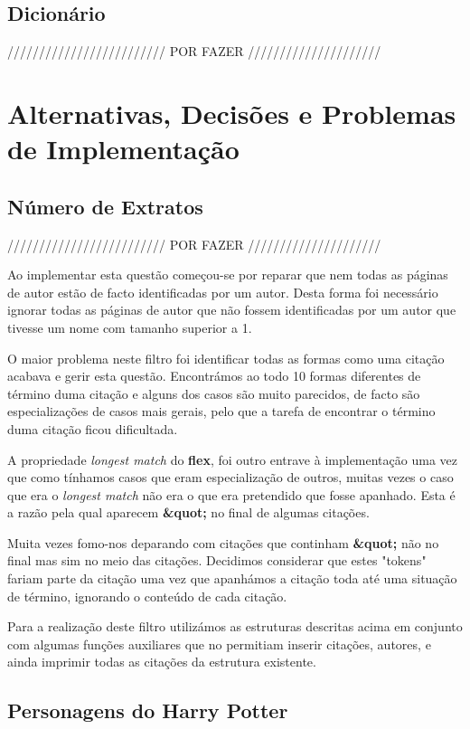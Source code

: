 \documentclass[11pt,a4paper]{report}
\begin{document}
\subsection{Dicionário}
///////////////////////// POR FAZER /////////////////////

\section{Alternativas, Decisões e Problemas de Implementação}

\subsection{Número de Extratos}

///////////////////////// POR FAZER /////////////////////

Ao implementar esta questão começou-se por reparar que nem todas as páginas de autor estão de facto identificadas por um autor. Desta forma foi necessário ignorar todas as páginas de autor que não fossem identificadas por um autor que tivesse um nome com tamanho superior a 1.

O maior problema neste filtro foi identificar todas as formas como uma citação acabava e gerir esta questão. Encontrámos ao todo 10 formas diferentes de término duma citação e alguns dos casos são muito parecidos, de facto são especializações de casos mais gerais, pelo que a tarefa de encontrar o término duma citação ficou dificultada.

A propriedade \emph{longest match} do \textbf{flex}, foi outro entrave à implementação uma vez que como tínhamos casos que eram especialização de outros, muitas vezes o caso que era o \emph{longest match} não era o que era pretendido que fosse apanhado. Esta é a razão pela qual aparecem \textbf{\&quot;} no final de algumas citações.

Muita vezes fomo-nos deparando com citações que continham \textbf{\&quot;} não no final mas sim no meio das citações. Decidimos considerar que estes "tokens"  fariam parte da citação uma vez que apanhámos a citação toda até uma situação de término, ignorando o conteúdo de cada citação.

Para a realização deste filtro utilizámos as estruturas descritas acima em conjunto com algumas funções auxiliares que no permitiam inserir citações, autores, e ainda imprimir todas as citações da estrutura existente.


\subsection{Personagens do Harry Potter}
\end{document}
